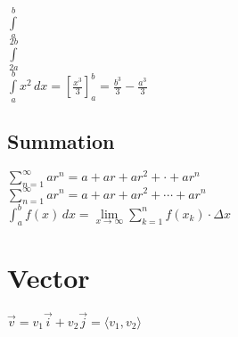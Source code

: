 \documentclass[11pt, a4paper]{article}
\begin{document}
$ \displaystyle{ \int \limits_a^b } $ \\

$ \displaystyle{ \int \limits_{2a}^{2b} } $ \\

$ \displaystyle{ \int \limits_a^b } x^2 \, dx = \left[ \frac{x^3}{3} \right]_{a}^{b} =\frac{b^3}{3} - \frac{a^3}{3} $ \\

\subsection{Summation}

$ \displaystyle { \sum \limits_{n = 1}^{\infty} ar^n = a+ ar +ar^2 + \cdot + ar^n }$ \\

$ \displaystyle { \sum \limits_{n = 1}^{\infty} ar^n = a+ ar +ar^2 + \cdots + ar^n }$ \\

$ \displaystyle {  \int_a^b f(x) \, dx = \lim \limits_{x \to \infty}  \sum \limits_{k=1}^n f(x_k) \cdot \Delta x    } $ \\

\section{Vector}

$  \vec{v} = v_1 \vec{i} + v_2 \vec{j} = \langle v_1, v_2 \rangle  $ \\
\end{document}
